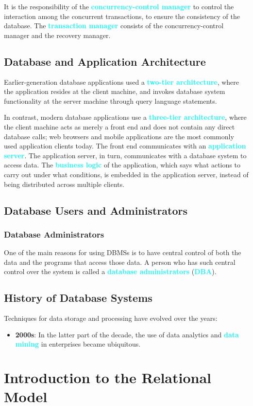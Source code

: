 \documentclass{Beautybook-EN}
\newcommand{\textcy}[1]{\textbf{\textcolor{cyan}{#1}}}
\begin{document}
It is the responsibility of the \textcy{concurrency-control manager} to control the interaction among the concurrent transactions, to ensure the consistency of the database. The \textcy{transaction manager} consists of the concurrency-control manager and the recovery manager.

\section{Database and Application Architecture}

Earlier-generation database applications used a \textcy{two-tier architecture}, where the application resides at the client machine, and invokes database system functionality at the server machine through query language statements.

In contrast, modern database applications use a \textcy{three-tier architecture}, where the client machine acts as merely a front end and does not contain any direct database calls; web browsers and mobile applications are the most commonly used application clients today. The front end communicates with an \textcy{application server}. The application server, in turn, communicates with a database system to access data. The \textcy{business logic} of the application, which says what actions to carry out under what conditions, is embedded in the application server, instead of being distributed across multiple clients.

\section{Database Users and Administrators}
\subsection{Database Administrators}

One of the main reasons for using DBMSs is to have central control of both the data and the programs that access those data. A person who has such central control over the system is called a \textcy{database administrators} (\textcy{DBA}).

\section{History of Database Systems}

Techniques for data storage and processing have evolved over the years:
\begin{itemize}
    \item\textbf{2000s}: In the latter part of the decade, the use of data analytics and \textcy{data mining} in enterprises became ubiquitous.
\end{itemize}

\chapter{Introduction to the Relational Model}

{ %
\normalem
\thispagestyle{empty}}
\makebottomcover
\end{document}
